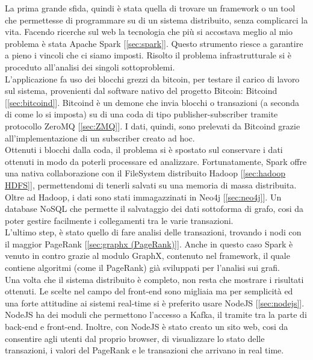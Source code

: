 La prima grande sfida, quindi è stata quella di trovare un framework o un tool che permettesse di programmare su di un sistema distribuito, senza complicarci la vita. Facendo ricerche sul web la tecnologia che più si accostava meglio al mio problema è stata Apache Spark [\ref{sec:spark}]. Questo strumento riesce a garantire a pieno i vincoli che ci siamo imposti. Risolto il problema infrastrutturale si è proceduto all'analisi dei singoli sottoproblemi. 
\\L'applicazione fa uso dei blocchi grezzi da bitcoin, per testare il carico di lavoro sul sistema, provenienti dal software nativo del progetto Bitcoin: Bitcoind [\ref{sec:bitcoind}]. Bitcoind è un demone che invia blocchi o transazioni (a seconda di come lo si imposta) su di una coda di tipo publisher-subscriber tramite protocollo ZeroMQ [\ref{sec:ZMQ}]. I dati, quindi, sono prelevati da Bitcoind grazie all'implementazione di un subscriber creato ad hoc.
\\Ottenuti i blocchi dalla coda, il problema si è spostato sul conservare i dati ottenuti in modo da poterli processare ed analizzare. Fortunatamente, Spark offre una nativa collaborazione con il FileSystem distribuito Hadoop [\ref{sec:hadoop HDFS}], permettendomi di tenerli salvati su una memoria di massa distribuita.
\\Oltre ad Hadoop, i dati sono stati immagazzinati in Neo4j [\ref{sec:neo4j}]. Un database NoSQL che permette il salvataggio dei dati sottoforma di grafo, cosi da poter gestire facilmente i collegamenti tra le varie transazioni.
\\L'ultimo step, è stato quello di fare analisi delle transazioni, trovando i nodi con il maggior PageRank [\ref{sec:graphx (PageRank)}]. Anche in questo caso Spark è venuto in contro grazie al modulo GraphX, contenuto nel framework, il quale contiene algoritmi (come il PageRank) già sviluppati per l'analisi sui grafi.  
\\Una volta che il sistema distribuito è completo, non resta che mostrare i risultati ottenuti. Le scelte nel campo del front-end sono migliaia ma per semplicità ed una forte attitudine ai sistemi real-time si è preferito usare NodeJS [\ref{sec:nodejs}]. NodeJS ha dei moduli che permettono l'accesso a Kafka, il tramite tra la parte di back-end e front-end. Inoltre, con NodeJS è stato creato un sito web, cosi da consentire agli utenti dal proprio browser, di visualizzare lo stato delle transazioni, i valori del PageRank e le transazioni che arrivano in real time.








